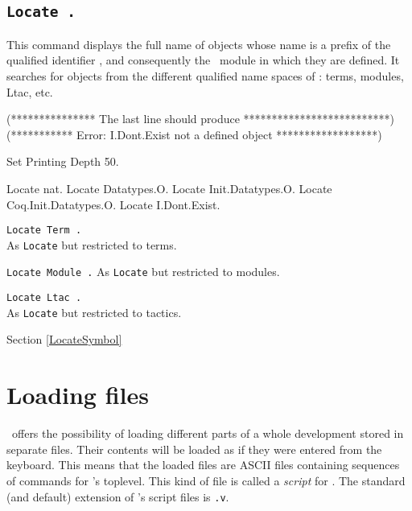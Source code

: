 
\subsection[\tt Locate {\qualid}.]{\tt Locate {\qualid}.
\label{Locate}}
This command displays the full name of objects whose name is a prefix of the
qualified identifier {\qualid}, and consequently the \Coq\ module in which they
are defined. It searches for objects from the different qualified name spaces of
{\Coq}: terms, modules, Ltac, etc.

\begin{coq_eval}
(*************** The last line should produce **************************)
(*********** Error: I.Dont.Exist not a defined object ******************)
\end{coq_eval}
\begin{coq_eval}
Set Printing Depth 50.
\end{coq_eval}
\begin{coq_example}
Locate nat.
Locate Datatypes.O.
Locate Init.Datatypes.O.
Locate Coq.Init.Datatypes.O.
Locate I.Dont.Exist.
\end{coq_example}

\begin{Variants}
\item {\tt Locate Term {\qualid}.}\\
  As {\tt Locate} but restricted to terms.

\item {\tt Locate Module {\qualid}.}
  As {\tt Locate} but restricted to modules.

\item {\tt Locate Ltac {\qualid}.}\\
  As {\tt Locate} but restricted to tactics.
\end{Variants}


\SeeAlso Section \ref{LocateSymbol}

\section{Loading files}

\Coq\ offers the possibility of loading different
parts of a whole development stored in separate files. Their contents
will be loaded as if they were entered from the keyboard. This means
that the loaded files are ASCII files containing sequences of commands
for \Coq's toplevel. This kind of file is called a {\em script} for
\Coq{}. The standard (and default) extension of
\Coq's script files is {\tt .v}.

